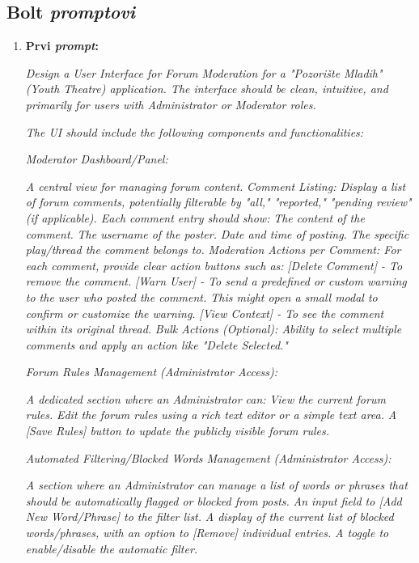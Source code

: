 \sloppy  
\subsection{Bolt \textit{promptovi}}

\begin{enumerate}[itemsep=1ex]
    \item \textbf{Prvi \textit{prompt}:}

    \textit{
    Design a User Interface for Forum Moderation for a "Pozorište Mladih" (Youth Theatre) application. The interface should be clean, intuitive, and primarily for users with Administrator or Moderator roles.}

    \textit{
    The UI should include the following components and functionalities:}
    
    \textit{Moderator Dashboard/Panel:}
    
    \textit{A central view for managing forum content.}
    \textit{Comment Listing: Display a list of forum comments, potentially filterable by "all," "reported," "pending review" (if applicable). Each comment entry should show:}
    \textit{The content of the comment.}
    \textit{The username of the poster.}
    \textit{Date and time of posting.}
    \textit{The specific play/thread the comment belongs to.}
    \textit{Moderation Actions per Comment: For each comment, provide clear action buttons such as:}
    \textit{[Delete Comment] - To remove the comment.}
    \textit{[Warn User] - To send a predefined or custom warning to the user who posted the comment. This might open a small modal to confirm or customize the warning.}
    \textit{[View Context] - To see the comment within its original thread.}
    \textit{Bulk Actions (Optional): Ability to select multiple comments and apply an action like "Delete Selected."}
    
    \textit{Forum Rules Management (Administrator Access):}
    
    \textit{A dedicated section where an Administrator can:}
    \textit{View the current forum rules.}
    \textit{Edit the forum rules using a rich text editor or a simple text area.}
    \textit{A [Save Rules] button to update the publicly visible forum rules.}
    
    \textit{Automated Filtering/Blocked Words Management (Administrator Access):}
    
    \textit{A section where an Administrator can manage a list of words or phrases that should be   automatically flagged or blocked from posts.}
    \textit{An input field to [Add New Word/Phrase] to the filter list.}
    \textit{A display of the current list of blocked words/phrases, with an option to [Remove] individual entries.}
    \textit{A toggle to enable/disable the automatic filter.}
    

\end{enumerate}
